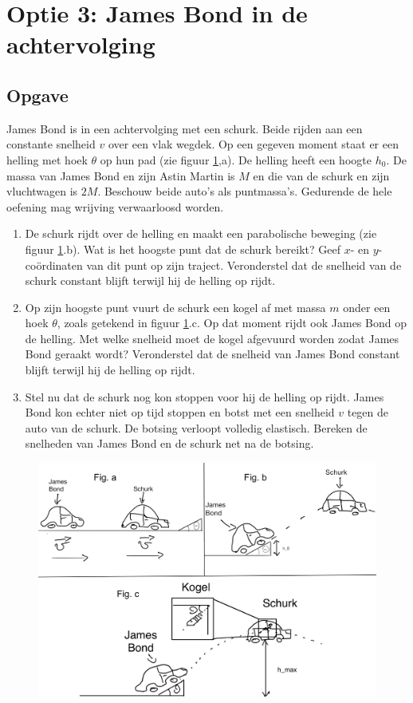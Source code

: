 \documentclass[a4paper,11pt]{article}
\begin{document}
\newpage 
\section*{Optie 3: James Bond in de achtervolging}
\subsection*{Opgave}
James Bond is in een achtervolging met een schurk. Beide rijden aan een constante snelheid $v$ over een vlak wegdek. Op een gegeven moment staat er een helling met hoek $\theta$ op hun pad (zie figuur \ref{fig:Bond},a). De helling heeft een hoogte $h_0$. De massa van James Bond en zijn Astin Martin is $M$ en die van de schurk en zijn vluchtwagen is $2M$. Beschouw beide auto's als puntmassa's. Gedurende de hele oefening mag wrijving verwaarloosd worden.
\begin{enumerate}[label=(\alph*)]
    \item De schurk rijdt over de helling en maakt een parabolische beweging (zie figuur \ref{fig:Bond}.b). Wat is het hoogste punt dat de schurk bereikt? Geef $x$- en $y$-coördinaten van dit punt op zijn traject. Veronderstel dat de snelheid van de schurk constant blijft terwijl hij de helling op rijdt.
    \item Op zijn hoogste punt vuurt de schurk een kogel af met massa $m$ onder een hoek $\theta$, zoals getekend in figuur \ref{fig:Bond}.c. Op dat moment rijdt ook James Bond op de helling. Met welke snelheid moet de kogel afgevuurd worden zodat James Bond geraakt wordt? Veronderstel dat de snelheid van James Bond constant blijft terwijl hij de helling op rijdt.
    \item Stel nu dat de schurk nog kon stoppen voor hij de helling op rijdt. James Bond kon echter niet op tijd stoppen en botst met een snelheid $v$ tegen de auto van de schurk. De botsing verloopt volledig elastisch. Bereken de snelheden van James Bond en de schurk net na de botsing. 
\end{enumerate}

\begin{figure}[H]
    \centering
    \includegraphics[width = \textwidth]{James_Bond.png} 
    \caption{}
    \label{fig:Bond}
\end{figure}
\end{document}

